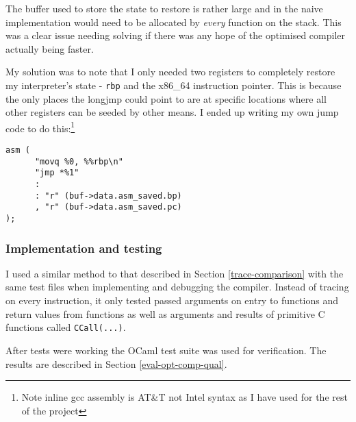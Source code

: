 The buffer used to store the state to restore is rather large and in the naive implementation would
need to be allocated by \emph{every} function on the stack. This was a clear issue needing solving
if there was any hope of the optimised compiler actually being faster.

My solution was to note that I only needed two registers to completely restore my interpreter's
state - \texttt{rbp} and the x86\_64 instruction pointer. This is because the only places the
longjmp could point to are at specific locations where all other registers can be seeded by other
means. I ended up writing my own jump code to do this:\footnote{Note inline gcc assembly is AT\&T
      not Intel
      syntax as I have used for the rest of the project}

\begin{verbatim}
asm (
      "movq %0, %%rbp\n"
      "jmp *%1"
      :
      : "r" (buf->data.asm_saved.bp)
      , "r" (buf->data.asm_saved.pc)
);
\end{verbatim}

\subsubsection{Implementation and testing}

I used a similar method to that described in Section \ref{trace-comparison} with the same test
files
when implementing and debugging the compiler. Instead of tracing on every instruction, it only
tested
passed arguments on entry to functions and return values from functions as well as arguments and
results of
primitive C functions called \texttt{CCall(...)}.

After tests were working the OCaml test suite was used for verification. The results are described
in Section
\ref{eval-opt-comp-qual}.

